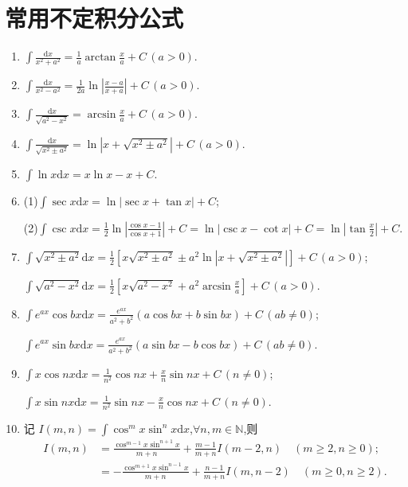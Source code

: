 \documentclass[../../main.tex]{subfiles}%
\begin{document}
\section{常用不定积分公式}

\begin{enumerate}
\item $\int\frac{\mathrm{d}x}{x^2+a^2}=\frac{1}{a}\arctan\frac{x}{a}+C\,(a>0)$.

\item $\int\frac{\mathrm{d}x}{x^2-a^2}=\frac{1}{2a}\ln\left|\frac{x-a}{x+a}\right|+C\,(a>0)$.

\item $\int\frac{\mathrm{d}x}{\sqrt{a^2-x^2}}=\arcsin\frac{x}{a}+C\,(a>0)$.

\item $\int\frac{\mathrm{d}x}{\sqrt{x^2\pm a^2}}=\ln\left|x+\sqrt{x^2\pm a^2}\right|+C\,(a>0)$.

\item $\int\ln x\mathrm{d}x=x\ln x-x+C$.

\item (1)$\int\sec x\mathrm{d}x=\ln|\sec x+\tan x|+C$;

(2)$\int\csc x\mathrm{d}x=\frac{1}{2}\ln \left| \frac{\cos x-1}{\cos x+1} \right|+C=\ln|\csc x-\cot x|+C=\ln|\tan \frac{x}{2}| + C.$

\item $\int\sqrt{x^2\pm a^2}\mathrm{d}x=\frac{1}{2}\left[x\sqrt{x^2\pm a^2}\pm a^2\ln\left|x+\sqrt{x^2\pm a^2}\right|\right]+C\,(a>0)$;

$\int\sqrt{a^2-x^2}\mathrm{d}x=\frac{1}{2}\left[x\sqrt{a^2-x^2}+a^2\arcsin\frac{x}{a}\right]+C\,(a>0)$.

\item $\int e^{ax}\cos bx\mathrm{d}x=\frac{e^{ax}}{a^2+b^2}(a\cos bx+b\sin bx)+C\,(ab\neq0)$;

$\int e^{ax}\sin bx\mathrm{d}x=\frac{e^{ax}}{a^2+b^2}(a\sin bx-b\cos bx)+C\,(ab\neq0)$.

\item $\int x\cos nx\mathrm{d}x=\frac{1}{n^2}\cos nx+\frac{x}{n}\sin nx+C\,(n\neq0)$;

$\int x\sin nx\mathrm{d}x=\frac{1}{n^2}\sin nx-\frac{x}{n}\cos nx+C\,(n\neq0)$.

\item 记 $I(m,n)=\int\cos^m x\sin^n x\mathrm{d}x$,$\forall n,m\in\mathbb{N}$,则
\begin{align*}
I(m,n)&=\frac{\cos^{m-1}x\sin^{n+1}x}{m+n}+\frac{m-1}{m+n}I(m-2,n)\quad(m\geqslant 2,n\geqslant 0);\\
&=-\frac{\cos^{m+1}x\sin^{n-1}x}{m+n}+\frac{n-1}{m+n}I(m,n-2)\quad(m\geqslant 0,n\geqslant 2).
\end{align*}
\end{enumerate}
\end{document}
